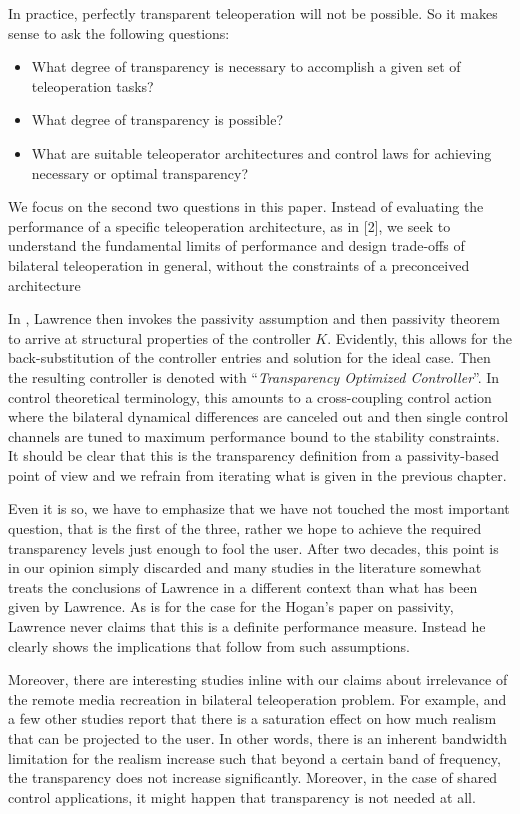 \begin{displayquote}
In practice, perfectly transparent teleoperation will not be possible. So it makes sense to ask the following questions:
\begin{itemize}
	\item What degree of transparency is necessary to accomplish a given set of teleoperation tasks? 
	\item What degree of transparency is possible?
	\item What are suitable teleoperator architectures and control laws for achieving necessary or optimal transparency?
\end{itemize}
We focus on the second two questions in this paper. Instead of evaluating the performance of a specific teleoperation architecture,
as in [2], we seek to understand the fundamental limits of performance and design trade-offs of bilateral teleoperation in
general, without the constraints of a preconceived architecture
\end{displayquote}
In \cite{lawrence}, Lawrence then invokes the passivity assumption and then passivity theorem to arrive at structural 
properties of the controller $K$. Evidently, this allows for the back-substitution of the controller entries and solution
for the ideal case. Then the resulting controller is denoted with \enquote{\emph{Transparency Optimized Controller}}. In 
control theoretical terminology, this amounts to a cross-coupling control action where the bilateral dynamical differences
are canceled out and then single control channels are tuned to maximum performance bound to the stability constraints. It 
should be clear that this is the transparency definition from a passivity-based point of view and we refrain from iterating 
what is given in the previous chapter. 

Even it is so, we have to emphasize that we have not touched the most important question, that is the first of the three, 
rather we hope to achieve the required transparency levels just enough to fool the user. After two decades, this point is 
in our opinion simply discarded and many studies in the literature somewhat treats the conclusions of Lawrence in a different 
context than what has been given by Lawrence. As is for the case for the Hogan's paper on passivity, Lawrence never claims 
that this is a definite performance measure. Instead he clearly shows the implications that follow from such assumptions. 


Moreover, there are interesting studies inline with our claims about irrelevance of the remote media recreation in bilateral
teleoperation problem. For example, \cite{kilchenman,wildenbeest} and a few other studies report that there is a saturation
effect on how much realism that can be projected to the user. In other words, there is an inherent bandwidth limitation for 
the realism increase such that beyond a certain band of frequency, the transparency does not increase significantly. Moreover, 
in the case of shared control applications, it might happen that transparency is not needed at all. 



